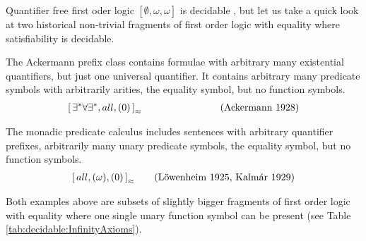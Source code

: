 \noindent
Quantifier free first oder logic \([\emptyset, \omega, \omega ]\) is decidable \cite{Kroening:2008:DPA:1391237}, 
but let us take a quick look at two historical non-trivial fragments of first order logic with equality where satisfiability is decidable.

\begin{example}\label{ex:ackermann}
	The Ackermann prefix class contains formulae with arbitrary many existential quantifiers,
	but just one universal quantifier. It contains arbitrary many predicate symbols
	with arbitrarily arities, the equality symbol, but no function symbols.
	\begin{gather*}
	{[\,\exists^*\forall\exists^*,all,(0) \,]}_{\approx}\qquad\qquad\qquad
	\tag{Ackermann 1928}
	\end{gather*}
\end{example}

\begin{example}\label{ex:monadic}
	The monadic predicate calculus includes sentences with arbitrary quantifier prefixes,
	arbitrarily many unary predicate symbols, the equality symbol, but no function symbols.
	\begin{gather*}
	{[\,all, (\omega), (0 ) \,]}_{\approx}
	\tag{Löwenheim 1925, Kalmár 1929}
	\end{gather*}
\end{example}

Both examples above are subsets of slightly bigger fragments of first order logic 
with equality where one single unary function symbol can be present
(see Table \ref{tab:decidable:InfinityAxioms}).





